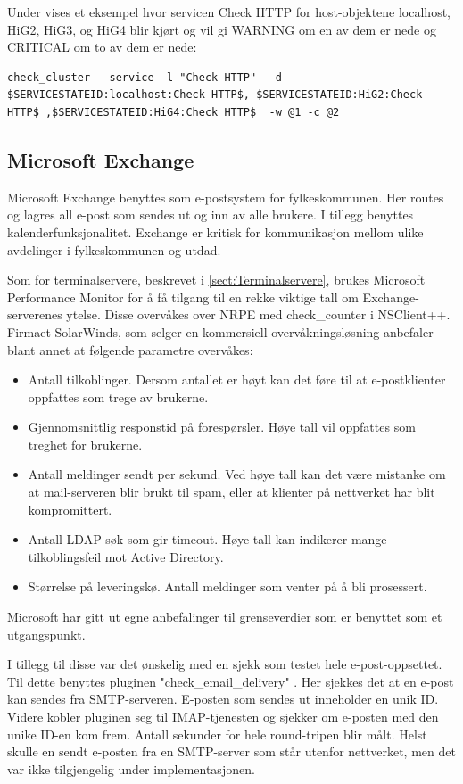 Under vises et eksempel hvor servicen Check HTTP for host-objektene localhost, HiG2, HiG3, og HiG4 blir kjørt og vil gi WARNING om en av dem er nede og CRITICAL om to av dem er nede: 
\begin{lstlisting}
check_cluster --service -l "Check HTTP"  -d $SERVICESTATEID:localhost:Check HTTP$, $SERVICESTATEID:HiG2:Check HTTP$ ,$SERVICESTATEID:HiG4:Check HTTP$  -w @1 -c @2
\end{lstlisting}

\subsection{Microsoft Exchange}

Microsoft Exchange benyttes som e-postsystem for fylkeskommunen. Her routes og lagres all e-post som sendes ut og inn av alle brukere. I tillegg benyttes kalenderfunksjonalitet. Exchange er kritisk for kommunikasjon mellom ulike avdelinger i fylkeskommunen og utdad. 

Som for terminalservere, beskrevet i \ref{sect:Terminalservere}, brukes Microsoft Performance Monitor for å få tilgang til en rekke viktige tall om Exchange-serverenes ytelse. Disse overvåkes over NRPE med check\_counter i NSClient++. Firmaet SolarWinds, som selger en kommersiell overvåkningsløsning anbefaler blant annet at følgende parametre overvåkes\cite{exchange}:
\begin{itemize}
	\item Antall tilkoblinger. Dersom antallet er høyt kan det føre til at e-postklienter oppfattes som trege av brukerne.
	\item Gjennomsnittlig responstid på forespørsler. Høye tall vil oppfattes som treghet for brukerne.
	\item Antall meldinger sendt per sekund. Ved høye tall kan det være mistanke om at mail-serveren blir brukt til spam, eller at klienter på nettverket har blit kompromittert.
	\item Antall LDAP-søk som gir timeout. Høye tall kan indikerer mange tilkoblingsfeil mot Active Directory.
	\item Størrelse på leveringskø. Antall meldinger som venter på å bli prosessert.
\end{itemize}
Microsoft har gitt ut egne anbefalinger til grenseverdier som er benyttet som et utgangspunkt\cite{exchangethresholds}.

I tillegg til disse var det ønskelig med en sjekk som testet hele e-post-oppsettet. Til dette benyttes pluginen "check\_email\_delivery" \cite{exchange}. Her sjekkes det at en e-post kan sendes fra SMTP-serveren. E-posten som sendes ut inneholder en unik ID. Videre kobler pluginen seg til IMAP-tjenesten og sjekker om e-posten med den unike ID-en kom frem. Antall sekunder for hele round-tripen blir målt. Helst skulle en sendt e-posten fra en SMTP-server som står utenfor nettverket, men det var ikke tilgjengelig under implementasjonen.

